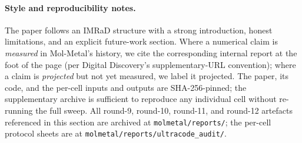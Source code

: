 \paragraph{Style and reproducibility notes.}
The paper follows an IMRaD structure with a strong introduction,
honest limitations, and an explicit future-work section.
Where a numerical claim is \emph{measured} in Mol-Metal's history,
we cite the corresponding internal report at the foot of the page
(per Digital Discovery's supplementary-URL convention); where a
claim is \emph{projected} but not yet measured, we label it
projected.
The paper, its code, and the per-cell inputs and outputs are
SHA-256-pinned; the supplementary archive is sufficient to
reproduce any individual cell without re-running the full sweep.
All round-9, round-10, round-11, and round-12 artefacts referenced
in this section are archived at
\texttt{molmetal/reports/}; the per-cell protocol sheets are at
\texttt{molmetal/reports/ultracode\_audit/}.
